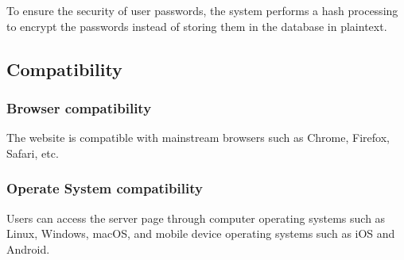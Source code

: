 \documentclass[conference]{IEEEtran}
\begin{document}
To ensure the security of user passwords, the system performs a hash 
processing to encrypt the passwords instead of storing them in the database in 
plaintext.


\subsection{ Compatibility }


\subsubsection{ Browser compatibility }


The website is compatible with mainstream browsers such as Chrome, 
Firefox, Safari, etc.

\subsubsection{ Operate System compatibility }

Users can access the server page through computer operating systems 
such as Linux, Windows, macOS, and mobile device operating systems such 
as iOS and Android.
\end{document}
